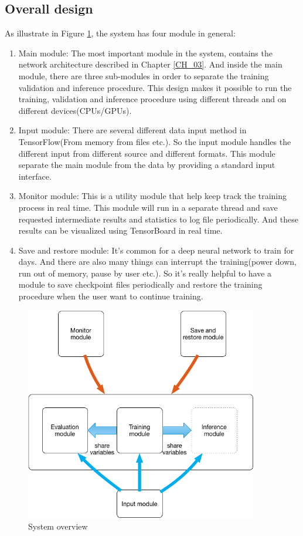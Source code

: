 \subsection{Overall design}
As illustrate in Figure \ref{fig:system}, the system has four module in general:
\begin{enumerate}
   \item Main module: The most important module in the system, contains the network architecture described in Chapter \ref{CH_03}. And inside the main module, there are three sub-modules in order to separate the training validation and inference procedure. This design makes it possible to run the training, validation and inference procedure using different threads and on different devices(CPUs/GPUs). 
   \item Input module: There are several different data input method in TensorFlow(From memory from files etc.). So the input module handles the different input from different source and different formats. This module separate the main module from the data by providing a standard input interface.
   \item Monitor module: This is a utility module that help keep track the training process in real time. This module will run in a separate thread and save requested intermediate results and statistics to log file periodically. And these results can be visualized using TensorBoard in real time.
   \item Save and restore module: It's common for a deep neural network to train for days. And there are also many things can interrupt the training(power down, run out of memory, pause by user etc.). So it's really helpful to have a module to save checkpoint files periodically and  
   restore the training procedure when the user want to continue training.
\end{enumerate}

\begin{figure}[H] 
	\centering
	\includegraphics[width=4in]{Figures/system}
	\caption[System overview]{System overview}
	\label{fig:system}
\end{figure}


